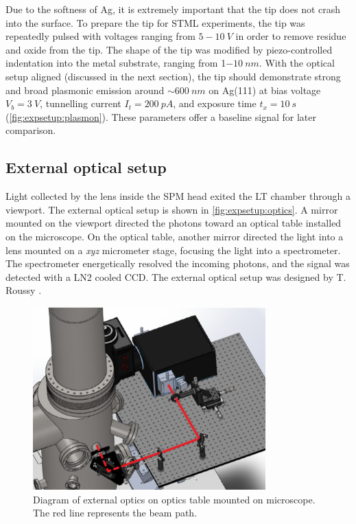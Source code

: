 
Due to the softness of Ag, it is extremely important that the tip does not crash into the surface. To prepare the tip for \ac{STML} experiments, the tip was repeatedly pulsed with voltages ranging from $5-\SI{10}{V}$ in order to remove residue and oxide from the tip. The shape of the tip was modified by piezo-controlled indentation into the metal substrate, ranging from 1$\SI{-10}{nm}$. With the optical setup aligned (discussed in the next section), the tip should demonstrate strong and broad plasmonic emission around $\sim \SI{600}{nm}$ on Ag(111) at bias voltage $V_b = \SI{3}{V}$, tunnelling current $I_t = \SI{200}{pA}$, and exposure time $t_x = \SI{10}{s}$ (\autoref{fig:expsetup:plasmon}). These parameters offer a baseline signal for later comparison.




\subsection{External optical setup}

Light collected by the lens inside the \ac{SPM} head exited the \ac{LT} chamber through a viewport. The external optical setup is shown in \autoref{fig:expsetup:optics}. A mirror mounted on the viewport directed the photons toward an optical table installed on the microscope. On the optical table, another mirror directed the light into a lens mounted on a \textit{xyz} micrometer stage, focusing the light into a spectrometer. The spectrometer energetically resolved the incoming photons, and the signal was detected with a \ac{LN2} cooled \ac{CCD}. The external optical setup was designed by T. Roussy \citep{roussy2016coupling}.

\begin{figure} [h]
    \centering
    \includegraphics[width=0.8\textwidth]{pictures/optics_line.png}
    \caption{Diagram of external optics on optics table mounted on microscope. The red line represents the beam path.}
    \label{fig:expsetup:optics}
\end{figure}

